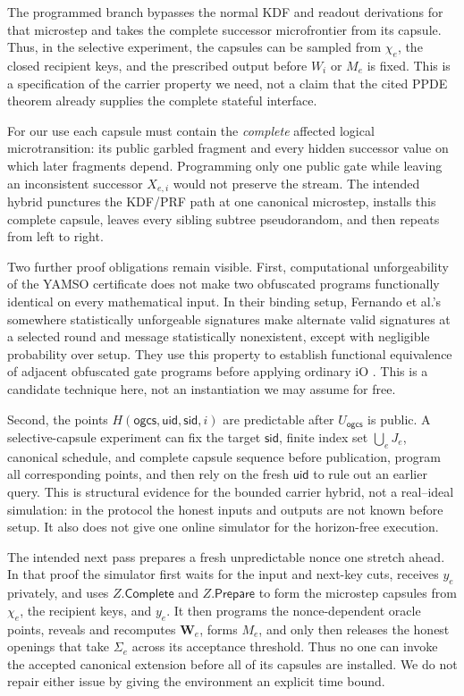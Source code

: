 The programmed branch bypasses the normal KDF and readout derivations for
that microstep and takes the complete successor microfrontier from its
capsule.  Thus, in the selective experiment, the capsules can be sampled from
$\chi_e$, the closed recipient keys, and the prescribed output before $W_i$
or $M_e$ is fixed.  This is a specification of the carrier property we need,
not a claim that the cited PPDE theorem already supplies the complete stateful
interface.

For our use each capsule must contain the \emph{complete} affected logical
microtransition: its public garbled fragment and every hidden successor value
on which later fragments depend.  Programming only one public gate while
leaving an inconsistent successor $X_{e,i}$ would not preserve the stream.
The intended hybrid punctures the KDF/PRF path at one canonical microstep,
installs this complete capsule, leaves every sibling subtree pseudorandom,
and then repeats from left to right.

Two further proof obligations remain visible.  First, computational
unforgeability of the YAMSO certificate does not make two obfuscated programs
functionally identical on every mathematical input.  In their binding setup,
Fernando et al.'s somewhere statistically unforgeable signatures make
alternate valid signatures at a selected round and message statistically
nonexistent, except with negligible probability over setup.  They use this
property to establish functional equivalence of adjacent obfuscated gate
programs before applying ordinary iO \cite{FernandoEtAl2023SSU}.  This is a
candidate technique here, not an instantiation we may assume for free.

Second, the points
$H(\mathsf{ogcs},\mathsf{uid},\mathsf{sid},i)$ are predictable after
$U_{\mathsf{ogcs}}$ is public.  A selective-capsule experiment can fix the
target $\mathsf{sid}$, finite index set $\bigcup_eJ_e$, canonical schedule,
and complete capsule sequence before publication, program all corresponding
points, and then rely on the fresh $\mathsf{uid}$ to rule out an earlier
query.  This is structural evidence for the bounded carrier hybrid, not a
real--ideal simulation: in the protocol the honest inputs and outputs are not
known before setup.  It also does not give one online simulator for the
horizon-free execution.

The intended next pass prepares a fresh unpredictable nonce one stretch
ahead.  In that proof the simulator first waits for the input and next-key
cuts, receives $y_e$ privately, and uses $Z.\mathsf{Complete}$ and
$Z.\mathsf{Prepare}$ to form the microstep capsules from $\chi_e$, the
recipient keys, and $y_e$.  It then programs the nonce-dependent oracle
points, reveals and recomputes $\mathbf W_e$, forms $M_e$, and only then
releases the honest openings that take $\Sigma_e$ across its acceptance
threshold.  Thus no one can invoke the accepted canonical extension before
all of its capsules are installed.
We do not repair either issue by giving the environment an explicit time bound.

